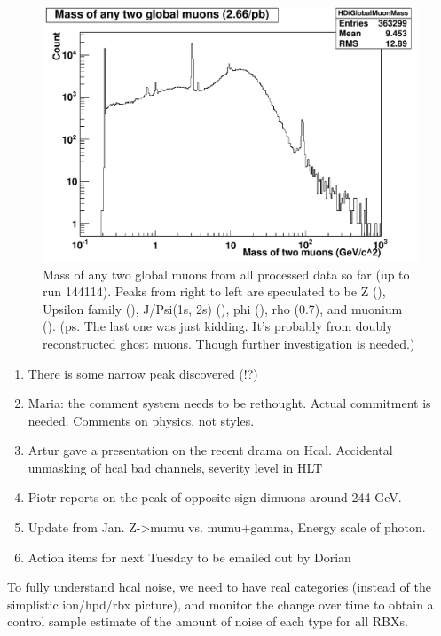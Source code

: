 \begin{figure}
\includegraphics[width=120mm]{DailyLog/6264/6264DiGlobalMuonMass_DataAll.pdf}
\caption{Mass of any two global muons from all processed data so far (up to run 144114).  Peaks from right to left are speculated to be
Z (), Upsilon family (), J/Psi(1s, 2s) (), phi (), rho (0.7), and muonium ().
(ps. The last one was just kidding.  It's probably from doubly reconstructed ghost muons.  Though further investigation is needed.)}
\label{Figure_6264DiGlobalMuonMass_DataAll}
\end{figure}



\begin{enumerate}
\item There is some narrow peak discovered (!?)
\item Maria: the comment system needs to be rethought.  Actual commitment is needed.
Comments on physics, not styles.
\item Artur gave a presentation on the recent drama on Hcal.  Accidental unmasking of hcal bad channels,
severity level in HLT
\item Piotr reports on the peak of opposite-sign dimuons around 244 GeV.
\item Update from Jan.  Z->mumu vs. mumu+gamma, Energy scale of photon.
\item Action items for next Tuesday to be emailed out by Dorian
\end{enumerate}


To fully understand hcal noise, we need to have real categories (instead of the simplistic ion/hpd/rbx picture),
and monitor the change over time to obtain a control sample estimate of the amount of noise of each type for all RBXs.


